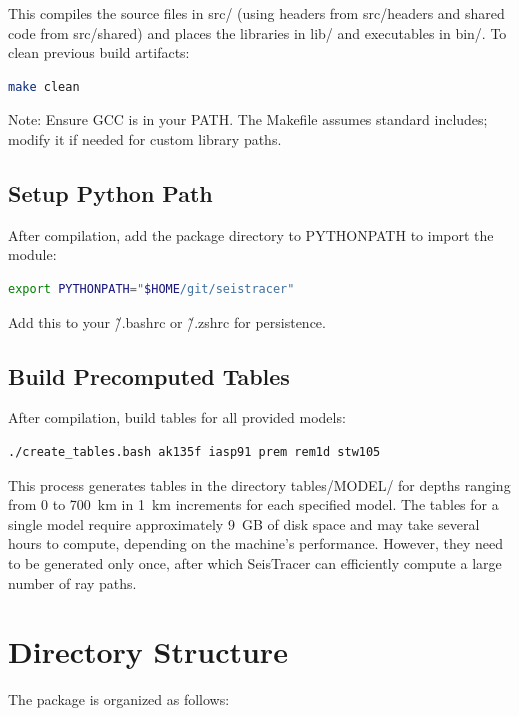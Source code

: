 \documentclass[12pt,a4paper]{article}
\begin{document}
This compiles the source files in src/ (using headers from src/headers and shared code from src/shared) and places the libraries in lib/ and executables in bin/.
To clean previous build artifacts:

\begin{lstlisting}[language=Bash]
make clean
\end{lstlisting}

Note: Ensure GCC is in your PATH. The Makefile assumes standard includes; modify it if needed for custom library paths.

\subsection{Setup Python Path}
After compilation, add the package directory to PYTHONPATH to import the module:

\begin{lstlisting}[language=Bash]
export PYTHONPATH="$HOME/git/seistracer"
\end{lstlisting}

Add this to your \~/.bashrc or \~/.zshrc for persistence.

\subsection{Build Precomputed Tables}
After compilation, build tables for all provided models:

\begin{lstlisting}[language=Bash]
./create_tables.bash ak135f iasp91 prem rem1d stw105
\end{lstlisting}

This process generates tables in the directory tables/MODEL/ for depths ranging from 0 to 700~km in 1~km increments for each specified model. The tables for a single model require approximately 9~GB of disk space and may take several hours to compute, depending on the machine's performance. However, they need to be generated only once, after which SeisTracer can efficiently compute a large number of ray paths.

\section{Directory Structure}
The package is organized as follows:

\end{document}
